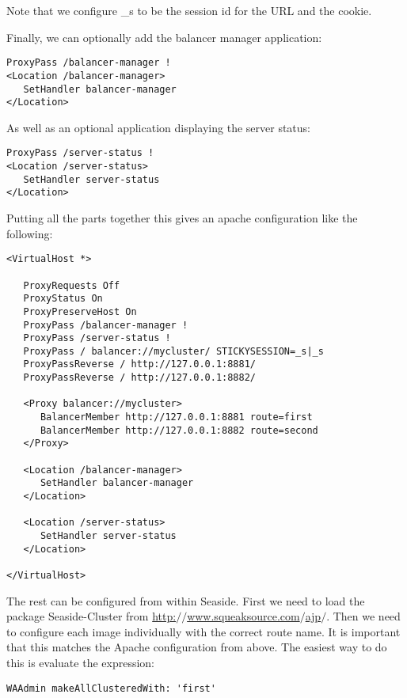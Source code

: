 \documentclass[a4paper,10pt,twoside]{book}
\newcommand{\ct}[1]{{\small\ttfamily\textup{#1}}}
\begin{document}
Note that we configure \ct{\_s} to be the session id for the URL and the cookie.

Finally, we can optionally add the balancer manager application:

\begin{lstlisting}
ProxyPass /balancer-manager !
<Location /balancer-manager>
   SetHandler balancer-manager
</Location>
\end{lstlisting}

As well as an optional application displaying the server status:

\begin{lstlisting}
ProxyPass /server-status !
<Location /server-status>
   SetHandler server-status
</Location>
\end{lstlisting}

Putting all the parts together this gives an apache configuration like the following:

\begin{lstlisting}
<VirtualHost *>

   ProxyRequests Off
   ProxyStatus On
   ProxyPreserveHost On
   ProxyPass /balancer-manager !
   ProxyPass /server-status !
   ProxyPass / balancer://mycluster/ STICKYSESSION=_s|_s
   ProxyPassReverse / http://127.0.0.1:8881/
   ProxyPassReverse / http://127.0.0.1:8882/
   
   <Proxy balancer://mycluster>
      BalancerMember http://127.0.0.1:8881 route=first
      BalancerMember http://127.0.0.1:8882 route=second
   </Proxy>
   
   <Location /balancer-manager>
      SetHandler balancer-manager
   </Location>
   
   <Location /server-status>
      SetHandler server-status
   </Location>

</VirtualHost>
\end{lstlisting}

The rest can be configured from within Seaside. First we need to load the package \ct{Seaside-Cluster} from \href{http://www.squeaksource.com/ajp/}{http:$/$$/$www.squeaksource.com$/$ajp$/$}. Then we need to configure each image individually with the correct route name. It is important that this matches the Apache configuration from above. The easiest way to do this is evaluate the expression:

\begin{lstlisting}
WAAdmin makeAllClusteredWith: 'first'
\end{lstlisting}
\end{document}
